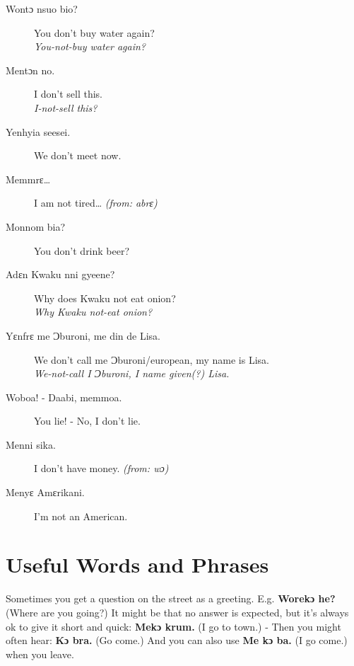 \documentclass[%
 fontsize=11pt,%
 a5paper,pagesize,
 paper=a5,%
 DIV=9,%
 parskip=half*,%
 twoside=true,
 pointlessnumbers
]{scrbook}%
\begin{document}
\begin{description}
  \item[Wontɔ nsuo bio?] You don't buy water again? \\
    \textit{You-not-buy water again?}
  \item[Mentɔn no.] I don't sell this. \\
    \textit{I-not-sell this?}
  \item[Yenhyia seesei.] We don't meet now.
  \item[Memmrɛ…] I am not tired… \textit{(from: abrɛ)}
  \item[Monnom bia?] You don't drink beer?
  \item[Adɛn Kwaku nni gyeene?] Why does Kwaku not eat onion? \\
    \textit{Why Kwaku not-eat onion?}
  \item[Yɛnfrɛ me Ɔburoni, me din de Lisa.] We don't call me Ɔburoni/european, my name is Lisa. \\
    \textit{We-not-call I Ɔburoni, I name given(?) Lisa.}
  \item[Woboa! - Daabi, memmoa.] You lie! - No, I don't lie.
  \item[Menni sika.] I don't have money. \textit{(from: wɔ)}
  \item[Menyɛ Amɛrikani.] I'm not an American.
\end{description}

\chapter{Useful Words and Phrases}

Sometimes you get a question on the street as a greeting. E.g. \textbf{Worekɔ he?} (Where are you going?) It might be that no answer is expected, but it's always ok to give it short and quick: \textbf{Mekɔ krum.} (I go to town.) - Then you might often hear: \textbf{Kɔ bra.} (Go come.) And you can also use \textbf{Me kɔ ba.} (I go come.) when you leave.
\end{document}
